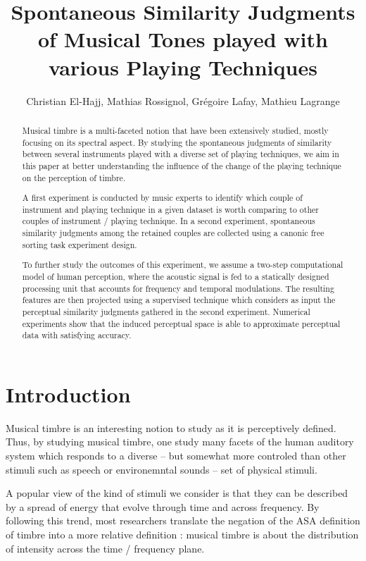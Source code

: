 \documentclass{article}
\title{Spontaneous Similarity Judgments of Musical Tones played with various Playing Techniques}
\author{Christian El-Hajj, Mathias Rossignol, Grégoire Lafay, Mathieu Lagrange}
\begin{document}
%
\maketitle
%
\begin{abstract}

Musical timbre is a multi-faceted notion that have been extensively studied, mostly focusing on its spectral aspect. By studying the spontaneous judgments of similarity between several instruments played with a diverse set of playing techniques, we aim in this paper at better understanding the influence of the change of the playing technique on the perception of timbre.

A first experiment is conducted by music experts to identify which couple of instrument and playing technique in a given dataset is worth comparing to other couples of instrument / playing technique. In a second experiment, spontaneous similarity judgments among the retained couples are collected using a canonic free sorting task experiment design.


To further study the outcomes of this experiment, we assume a two-step computational model of human perception, where the acoustic signal is fed to a statically designed processing unit that accounts for frequency and temporal modulations. The resulting features are then projected using a supervised technique which considers as input the perceptual similarity judgments gathered in the second experiment. Numerical experiments show that the induced perceptual space is able to approximate perceptual data with satisfying accuracy.

\end{abstract}
%
\section{Introduction}\label{sec:introduction}

Musical timbre is an interesting notion to study as it is perceptively defined. Thus, by studying musical timbre, one study many facets of the human auditory system which responds to a diverse -- but somewhat more controled than other stimuli such as speech or environemntal sounds -- set of physical stimuli.

A popular view of the kind of stimuli we consider is that they can be described by a spread of energy that evolve through time and across frequency. By following this trend, most researchers translate the negation of the ASA definition of timbre into a more relative definition : musical timbre is about the distribution of intensity across the time / frequency plane.
\end{document}
